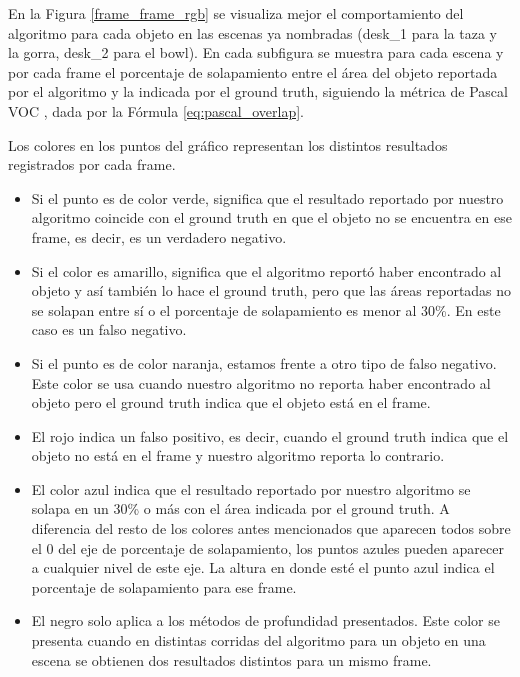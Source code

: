 En la Figura \ref{frame_frame_rgb} se visualiza mejor el comportamiento del algoritmo para cada objeto en las escenas ya nombradas (desk\_1 para la taza y la gorra, desk\_2 para el bowl). En cada subfigura se muestra para cada escena y por cada frame el porcentaje de solapamiento entre el área del objeto reportada por el algoritmo y la indicada por el ground truth, siguiendo la métrica de Pascal VOC \cite{everinghampascal}, dada por la Fórmula \ref{eq:pascal_overlap}.

Los colores en los puntos del gráfico representan los distintos resultados registrados por cada frame.
\begin{itemize}
	\item Si el punto es de color verde, significa que el resultado reportado por nuestro algoritmo coincide con el ground truth en que el objeto no se encuentra en ese frame, es decir, es un verdadero negativo.
	\item Si el color es amarillo, significa que el algoritmo reportó haber encontrado al objeto y así también lo hace el ground truth, pero que las áreas reportadas no se solapan entre sí o el porcentaje de solapamiento es menor al 30\%. En este caso es un falso negativo.
	\item Si el punto es de color naranja, estamos frente a otro tipo de falso negativo. Este color se usa cuando nuestro algoritmo no reporta haber encontrado al objeto pero el ground truth indica que el objeto está en el frame.
	\item El rojo indica un falso positivo, es decir, cuando el ground truth indica que el objeto no está en el frame y nuestro algoritmo reporta lo contrario.
	\item El color azul indica que el resultado reportado por nuestro algoritmo se solapa en un 30\% o más con el área indicada por el ground truth. A diferencia del resto de los colores antes mencionados que aparecen todos sobre el 0 del eje de porcentaje de solapamiento, los puntos azules pueden aparecer a cualquier nivel de este eje. La altura en donde esté el punto azul indica el porcentaje de solapamiento para ese frame.
	\item El negro solo aplica a los métodos de profundidad presentados. Este color se presenta cuando en distintas corridas del algoritmo para un objeto en una escena se obtienen dos resultados distintos para un mismo frame.
\end{itemize}

